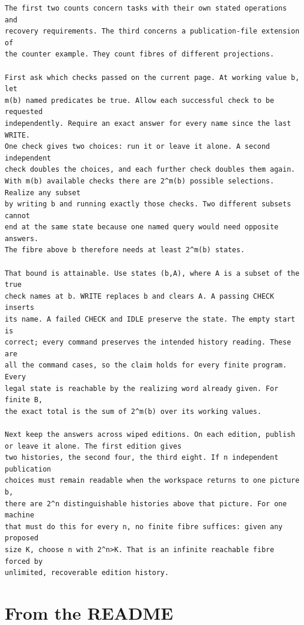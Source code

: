 \documentclass[11pt,twoside]{article}
\theoremstyle{thielethm}
\theoremstyle{thieledef}
\theoremstyle{thieledef}
\theoremstyle{thieledef}
\theoremstyle{thielethm}
\theoremstyle{thieleobs}
\theoremstyle{thielethm}
\begin{document}
\begin{small}
\begin{verbatim}
The first two counts concern tasks with their own stated operations and
recovery requirements. The third concerns a publication-file extension of
the counter example. They count fibres of different projections.

First ask which checks passed on the current page. At working value b, let
m(b) named predicates be true. Allow each successful check to be requested
independently. Require an exact answer for every name since the last WRITE.
One check gives two choices: run it or leave it alone. A second independent
check doubles the choices, and each further check doubles them again.
With m(b) available checks there are 2^m(b) possible selections. Realize any subset
by writing b and running exactly those checks. Two different subsets cannot
end at the same state because one named query would need opposite answers.
The fibre above b therefore needs at least 2^m(b) states.

That bound is attainable. Use states (b,A), where A is a subset of the true
check names at b. WRITE replaces b and clears A. A passing CHECK inserts
its name. A failed CHECK and IDLE preserve the state. The empty start is
correct; every command preserves the intended history reading. These are
all the command cases, so the claim holds for every finite program. Every
legal state is reachable by the realizing word already given. For finite B,
the exact total is the sum of 2^m(b) over its working values.

Next keep the answers across wiped editions. On each edition, publish or leave it alone. The first edition gives
two histories, the second four, the third eight. If n independent publication
choices must remain readable when the workspace returns to one picture b,
there are 2^n distinguishable histories above that picture. For one machine
that must do this for every n, no finite fibre suffices: given any proposed
size K, choose n with 2^n>K. That is an infinite reachable fibre forced by
unlimited, recoverable edition history.

\end{verbatim}\end{small}

\section{From the README}
\end{document}
